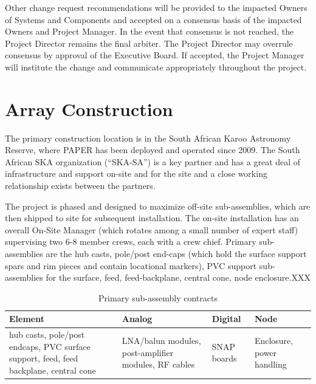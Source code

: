 \documentclass[preprint]{aastex}
\begin{document}
Other change request recommendations will be provided to the impacted Owners of Systems and
Components and accepted on a consensus basis of the impacted Owners and Project Manager.  
In the event that consensus is not reached, the Project Director remains the final arbiter.  The Project 
Director may overrule consensus by approval of the Executive Board.  If accepted, the Project Manager 
will institute the change and communicate appropriately throughout the project.

\section{Array Construction}
\label{sec:construction}
The primary construction location is in the South African Karoo Astronomy Reserve, where PAPER has been deployed
and operated since 2009.  The South African SKA organization (``SKA-SA'') is a key partner and has a great deal of
infrastructure and support on-site and for the site and a close working relationship exists between the partners.

The project is phased and designed to maximize off-site sub-assemblies, which are then shipped to site for subsequent
installation.  The on-site installation has an overall On-Site Manager (which rotates among a small number of expert
staff) supervising two 6-8 member crews, each with a crew chief.  Primary sub-assemblies are the hub casts, pole/post end-caps 
(which hold the surface support spars and rim pieces and contain locational markers), PVC support sub-assemblies 
for the surface, feed, feed-backplane, central cone, node enclosure.XXX

\begin{table}[tbh]
\centering
\label{tab:subassycontracts}
\caption{Primary sub-assembly contracts}
\begin{tabular}{| p{1.4in} | p{1.4in} | p{1.4in} | p{1.4in} |}\hline
\textbf{Element} & \textbf{Analog} & \textbf{Digital} & \textbf{Node} \\ \hline
hub casts, pole/post endcaps, PVC surface support, feed, feed backplane, central cone &
LNA/balun modules, post-amplifier modules, RF cables &
SNAP boards &
Enclosure, power handling \\ \hline
\end{tabular}
\end{table}
\end{document}
